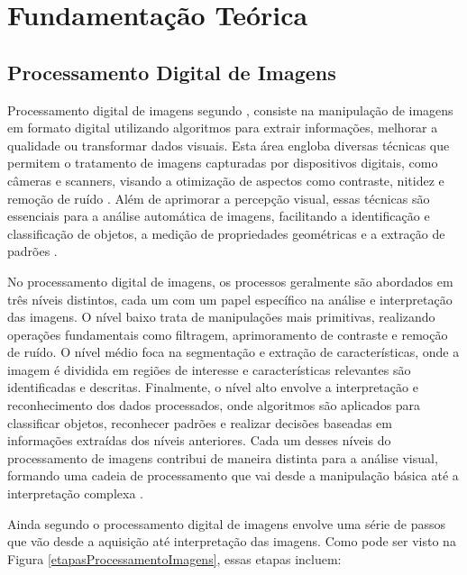 


\chapter{Fundamentação Teórica}

\section{Processamento Digital de Imagens}

Processamento digital de imagens segundo , consiste na manipulação de imagens em formato digital utilizando algoritmos para extrair informações, melhorar a qualidade ou transformar dados visuais. Esta área engloba diversas técnicas que permitem o tratamento de imagens capturadas por dispositivos digitais, como câmeras e scanners, visando a otimização de aspectos como contraste, nitidez e remoção de ruído \cite{gonzalez2010processamento}. Além de aprimorar a percepção visual, essas técnicas são essenciais para a análise automática de imagens, facilitando a identificação e classificação de objetos, a medição de propriedades geométricas e a extração de padrões \cite{russ2006image}.

No processamento digital de imagens, os processos geralmente são abordados em três níveis distintos, cada um com um papel específico na análise e interpretação das imagens. O nível baixo trata de manipulações mais primitivas, realizando operações fundamentais como filtragem, aprimoramento de contraste e remoção de ruído. O nível médio foca na segmentação e extração de características, onde a imagem é dividida em regiões de interesse e características relevantes são identificadas e descritas. Finalmente, o nível alto envolve a interpretação e reconhecimento dos dados processados, onde algoritmos são aplicados para classificar objetos, reconhecer padrões e realizar decisões baseadas em informações extraídas dos níveis anteriores. Cada um desses níveis do processamento de imagens contribui de maneira distinta para a análise visual, formando uma cadeia de processamento que vai desde a manipulação básica até a interpretação complexa \cite{gonzalez2010processamento}. 

Ainda segundo  o processamento digital de imagens envolve uma série de passos que vão desde a aquisição até interpretação das imagens. Como pode ser visto na Figura \ref{etapasProcessamentoImagens}, essas etapas incluem:


